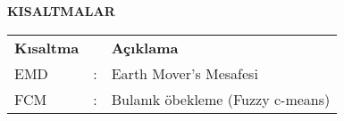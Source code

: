 \newpage
\pagestyle{plain}
\begin{center}
\textbf{KISALTMALAR}
\end{center}
\vspace{\satbos}

\begin{tabular}{@{}lll@{}}
\textbf{Kısaltma} &  & \textbf{Açıklama}\\
EMD & : & Earth Mover's Mesafesi\\
FCM & : & Bulanık öbekleme (Fuzzy c-means)\\
\end{tabular}
